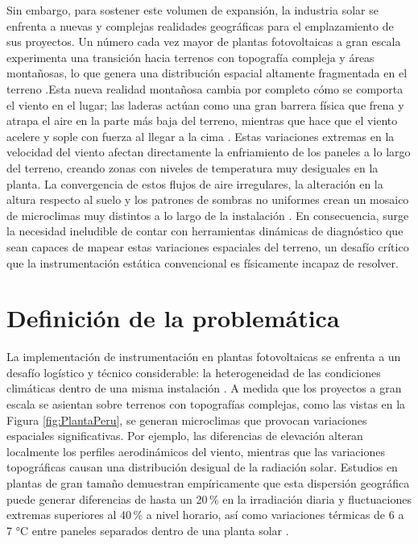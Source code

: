 Sin embargo, para sostener este volumen de expansión, la industria solar se enfrenta a nuevas y complejas realidades geográficas para el emplazamiento de sus proyectos. Un número cada vez mayor de plantas fotovoltaicas a gran escala experimenta una transición hacia terrenos con topografía compleja y áreas montañosas, lo que genera una distribución espacial altamente fragmentada en el terreno \citep{Mao2025}.Esta nueva realidad montañosa cambia por completo cómo se comporta el viento en el lugar; las laderas actúan como una gran barrera física que frena y atrapa el aire en la parte más baja del terreno, mientras que hace que el viento acelere y sople con fuerza al llegar a la cima \citep{Xu2024}. Estas variaciones extremas en la velocidad del viento afectan directamente la enfriamiento de los paneles a lo largo del terreno, creando zonas con niveles de temperatura muy desiguales en la planta. 
La convergencia de estos flujos de aire irregulares, la alteración en la altura respecto al suelo y los patrones de sombras no uniformes crean un mosaico de microclimas muy distintos a lo largo de la instalación \citep{Armstrong2026}. En consecuencia, surge la necesidad ineludible de contar con herramientas dinámicas de diagnóstico que sean capaces de mapear estas variaciones espaciales del terreno, un desafío crítico que la instrumentación estática convencional es físicamente incapaz de resolver.


\section{Definición de la problemática}

La implementación de instrumentación en plantas fotovoltaicas se enfrenta a un desafío logístico y técnico considerable: la heterogeneidad de las condiciones climáticas dentro de una misma instalación \citep{Salinas2025}. A medida que los proyectos a gran escala se asientan sobre terrenos con topografías complejas, como las vistas en la Figura \ref{fig:PlantaPeru}, se generan microclimas que provocan variaciones espaciales significativas. Por ejemplo, las diferencias de elevación alteran localmente los perfiles aerodinámicos del viento, mientras que las variaciones topográficas causan una distribución desigual de la radiación solar. Estudios en plantas de gran tamaño demuestran empíricamente que esta dispersión geográfica puede generar diferencias de hasta un 20\,\% en la irradiación diaria y fluctuaciones extremas superiores al 40\,\% a nivel horario, así como variaciones térmicas de 6 a 7 °C entre paneles separados dentro de una planta solar \citep{Garcia2014}. 




